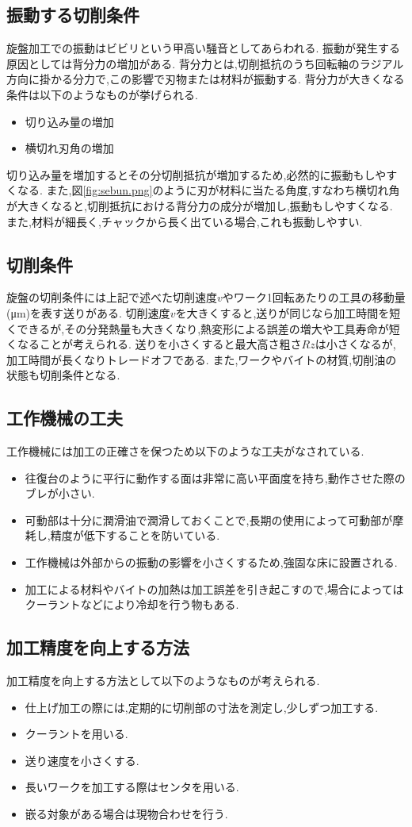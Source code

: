 \subsection{振動する切削条件}
旋盤加工での振動はビビリという甲高い騒音としてあらわれる.\cite{kuso}
振動が発生する原因としては背分力の増加がある.
背分力とは,切削抵抗のうち回転軸のラジアル方向に掛かる分力で,この影響で刃物または材料が振動する.
背分力が大きくなる条件は以下のようなものが挙げられる.
\begin{itemize}
  \item 切り込み量の増加\cite{whatis}
  \item 横切れ刃角の増加\cite{kuso}
\end{itemize}
切り込み量を増加するとその分切削抵抗が増加するため,必然的に振動もしやすくなる.\cite{whatis}
また,図\ref{fig:sebun.png}のように刃が材料に当たる角度,すなわち横切れ角が大きくなると,切削抵抗における背分力の成分が増加し,振動もしやすくなる.
また,材料が細長く,チャックから長く出ている場合,これも振動しやすい.
\subsection{切削条件}
旋盤の切削条件には上記で述べた切削速度$v$やワーク1回転あたりの工具の移動量(\si{\micro\metre})を表す送りがある.
切削速度$v$を大きくすると,送りが同じなら加工時間を短くできるが,その分発熱量も大きくなり,熱変形による誤差の増大や工具寿命が短くなることが考えられる.
送りを小さくすると最大高さ粗さ$Rz$は小さくなるが,加工時間が長くなりトレードオフである.
また,ワークやバイトの材質,切削油の状態も切削条件となる.
\subsection{工作機械の工夫}
工作機械には加工の正確さを保つため以下のような工夫がなされている.
\begin{itemize}
  \item 往復台のように平行に動作する面は非常に高い平面度を持ち,動作させた際のブレが小さい.
  \item 可動部は十分に潤滑油で潤滑しておくことで,長期の使用によって可動部が摩耗し,精度が低下することを防いている.
  \item 工作機械は外部からの振動の影響を小さくするため,強固な床に設置される.
  \item 加工による材料やバイトの加熱は加工誤差を引き起こすので,場合によってはクーラントなどにより冷却を行う物もある.
\end{itemize}
\subsection{加工精度を向上する方法}
加工精度を向上する方法として以下のようなものが考えられる.
\begin{itemize}
  \item 仕上げ加工の際には,定期的に切削部の寸法を測定し,少しずつ加工する.
  \item クーラントを用いる.
  \item 送り速度を小さくする.
  \item 長いワークを加工する際はセンタを用いる.
  \item 嵌る対象がある場合は現物合わせを行う.
\end{itemize}
